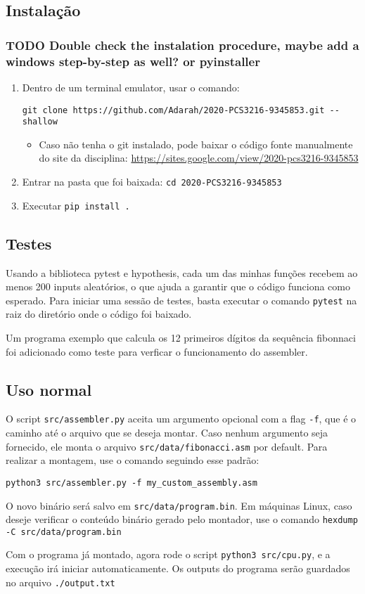 \documentclass[11pt]{article}
\begin{document}
\subsection{Instalação}
\label{sec:org882e333}
\subsubsection{{\bfseries\sffamily TODO} Double check the instalation procedure, maybe add a windows step-by-step as well? or pyinstaller}
\label{sec:org373e68c}

\begin{enumerate}
\item Dentro de um terminal emulator, usar o comando:

\texttt{git clone https://github.com/Adarah/2020-PCS3216-9345853.git -{}-shallow}
\begin{itemize}
\item Caso não tenha o git instalado, pode baixar o código fonte manualmente do site da disciplina:
\url{https://sites.google.com/view/2020-pcs3216-9345853}
\end{itemize}
\item Entrar na pasta que foi baixada: \texttt{cd 2020-PCS3216-9345853}
\item Executar \texttt{pip install .}
\end{enumerate}
\subsection{Testes}
\label{sec:org0cdd04b}
Usando a biblioteca pytest e hypothesis, cada um das minhas funções recebem ao
menos 200 inputs aleatórios, o que ajuda a garantir que o código funciona como
esperado. Para iniciar uma sessão de testes, basta executar o comando \texttt{pytest}
na raiz do diretório onde o código foi baixado.

Um programa exemplo que calcula os 12 primeiros dígitos da sequência fibonnaci
foi adicionado como teste para verficar o funcionamento do assembler.
\subsection{Uso normal}
\label{sec:org3ebe6d4}
O script \texttt{src/assembler.py} aceita um argumento opcional com a flag \texttt{-f}, que é
o caminho até o arquivo que se deseja montar. Caso nenhum argumento seja
fornecido, ele monta o arquivo \texttt{src/data/fibonacci.asm} por default. Para
realizar a montagem, use o comando seguindo esse padrão:

\texttt{python3 src/assembler.py -f my\_custom\_assembly.asm}

O novo binário será salvo em \texttt{src/data/program.bin}. Em máquinas Linux, caso deseje verificar o conteúdo
binário gerado pelo montador, use o comando \texttt{hexdump -C src/data/program.bin}

Com o programa já montado, agora rode o script \texttt{python3 src/cpu.py}, e a
execução irá iniciar automaticamente. Os outputs do programa serão guardados no
arquivo \texttt{./output.txt}
\end{document}
